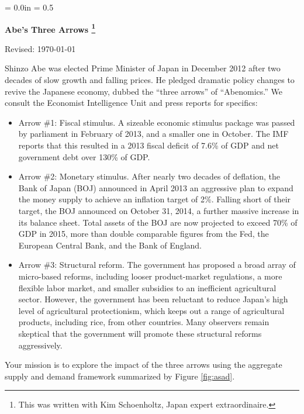 \documentclass[12pt]{article}
\def\HeadName{Abe's Three Arrows}
\begin{document}
\parindent = 0.0in
\parskip = 0.5\bigskipamount
\thispagestyle{empty}%
\Head

\centerline{\large \bf \HeadName%
\footnote{This was written with Kim Schoenholtz, Japan expert extraordinaire.}
}%
\centerline{Revised:  \today}



\bigskip
Shinzo Abe was elected Prime Minister of Japan in December 2012
after two decades of slow growth and falling prices.
He pledged dramatic policy changes to revive the Japanese economy,
dubbed the ``three arrows'' of ``Abenomics.''
We consult the Economist Intelligence Unit and press reports for specifics:
%
\begin{itemize}
\item Arrow \#1:  Fiscal stimulus.  A sizeable economic stimulus package was passed by parliament in
February of 2013, and a smaller one in October.
The IMF reports that this resulted in a 2013 fiscal deficit of 7.6\% of GDP
and net government debt over 130\% of GDP.

\item Arrow \#2: Monetary stimulus.
After nearly two decades of deflation, the Bank of Japan (BOJ) announced in April 2013
an aggressive plan to expand the money supply
to achieve an inflation target of 2\%.
Falling short of their target, the BOJ announced on October 31, 2014,
a further massive increase in its balance sheet.
Total assets of the BOJ are now projected to exceed 70\% of GDP in 2015,
more than double comparable figures from the Fed,
the European Central Bank, and the Bank of England.

\item Arrow \#3: Structural reform.
The government has proposed a broad array of micro-based reforms,
including looser product-market regulations,
a more flexible labor market,
and smaller subsidies to an inefficient agricultural sector.
However, the government has been reluctant to reduce Japan's high level of agricultural protectionism,
which keeps out a range of agricultural products, including rice, from other countries.
Many observers remain skeptical that the government will promote these structural reforms aggressively.
\end{itemize}
%
Your mission is to explore the impact of the three arrows using
the aggregate supply and demand framework summarized by Figure \ref{fig:asad}.
\end{document}
